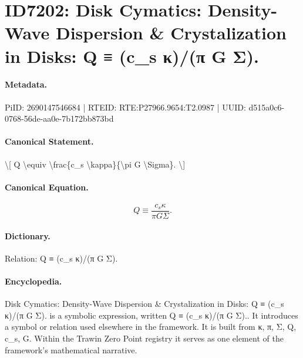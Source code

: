 \section*{ID7202: Disk Cymatics: Density-Wave Dispersion \& Crystalization in Disks: Q ≡ (c\_s κ)/(π G Σ).}
\paragraph{Metadata.}
PiID: 2690147546684 | RTEID: RTE:P27966.9654:T2.0987 | UUID: d515a0c6-0768-56de-aa0e-7b172bb873bd

\paragraph{Canonical Statement.}
\textbackslash{}[ Q \textbackslash{}equiv \textbackslash{}frac\{c\_s \textbackslash{}kappa\}\{\textbackslash{}pi G \textbackslash{}Sigma\}. \textbackslash{}]

\paragraph{Canonical Equation.}
\[
Q \equiv \frac{c_s \kappa}{\pi G \Sigma}.
\]

\paragraph{Dictionary.}
Relation: Q ≡ (c\_s κ)/(π G Σ).

\paragraph{Encyclopedia.}
Disk Cymatics: Density-Wave Dispersion \& Crystalization in Disks: Q ≡ (c\_s κ)/(π G Σ). is a symbolic expression, written Q ≡ (c\_s κ)/(π G Σ).. It introduces a symbol or relation used elsewhere in the framework. It is built from κ, π, Σ, Q, c\_s, G. Within the Trawin Zero Point registry it serves as one element of the framework's mathematical narrative.
